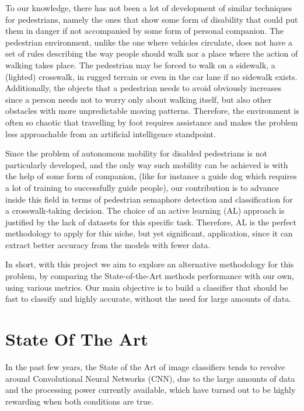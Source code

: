 \documentclass[journal, a4paper]{IEEEtran}
\begin{document}
To our knowledge, there has not been a lot of development of similar techniques 
for pedestrians, namely the ones that show some form of disability that could put 
them in danger if not accompanied by some form of personal companion. The 
pedestrian environment, unlike the one where vehicles circulate, does not have a 
set of rules describing the way people should walk nor a place where the action of 
walking takes place. The pedestrian may be forced to walk on a sidewalk, a 
(lighted) crosswalk, in rugged terrain or even in the car lane if no sidewalk 
exists. Additionally, the objects that a pedestrian needs to avoid obviously 
increases since a person needs not to worry only about walking itself, but also 
other obstacles with more unpredictable moving patterns. Therefore, the 
environment is often so chaotic that travelling by foot requires assistance and 
makes the problem less approachable from an artificial intelligence standpoint.

Since the problem of autonomous mobility for disabled pedestrians is not 
particularly developed, and the only way such mobility can be achieved is with 
the help of some form of companion, (like for instance a guide dog which requires 
a lot of training to successfully guide people), our contribution is to advance 
inside this field in terms of pedestrian semaphore detection and classification 
for a crosswalk-taking decision. The choice of an active learning (AL) approach 
is justified by the lack of datasets for this specific task. Therefore, AL is the 
perfect methodology to apply for this niche, but yet significant, application, 
since it can extract better accuracy from the models with fewer data.

In short, with this project we aim to explore an alternative methodology for 
this problem, by comparing the State-of-the-Art methods performance with our own, 
using various metrics. Our main objective is to build a classifier that should be 
fast to classify and highly accurate, without the need for large amounts of data.

\section{State Of The Art}

In the past few years, the State of the Art of image classifiers tends to revolve 
around Convolutional Neural Networks (CNN), due to the large amounts of data and 
the processing power currently available, which have turned out to be highly 
rewarding when both conditions are true.
\end{document}
